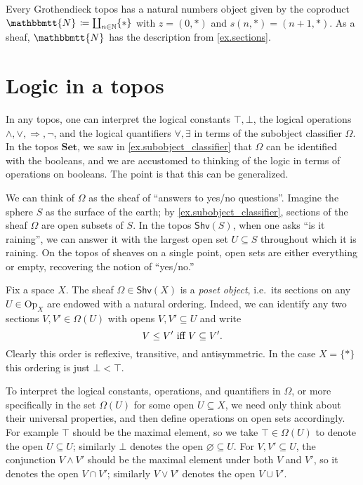\documentclass[11pt, oneside, article]{memoir}
\theoremstyle{plain}
\theoremstyle{definition}
\theoremstyle{remark}
\renewcommand{\ss}{\subseteq}
\newcommand{\Set}[1]{\mathrm{#1}}
\newcommand{\Cat}[1]{\mathbf{#1}}
\newcommand{\Fun}[1]{\mathsf{#1}}
\newcommand{\smset}{\Cat{Set}}
\newcommand{\tn}[1]{\textnormal{#1}}
\newcommand{\internal}[1]{\raisebox{-.03ex}{$\mathbbmtt{#1}$}}
\newcommand{\hs}{\hspace{1.1pt}}
\newcommand{\nn}{\mathbb{N}}
\newcommand{\tnn}{\internal{N}\hs}
\newcommand{\shv}{\Fun{Shv}}
\newcommand{\Op}{\Set{Op}}
\newcommand{\imp}{\Rightarrow}
\newcommand{\true}{\top}
\newcommand{\false}{\bot}
\begin{document}
Every Grothendieck topos has a natural numbers object given by the coproduct $\tnn\coloneqq\coprod_{n\in\nn}\{*\}$ with $z=(0,*)$ and $s(n,*)=(n+1,*)$. As a sheaf, $\tnn$ has the description from \cref{ex.sections}.


\section{Logic in a topos}\label{sec.logic}

In any topos, one can interpret the logical constants $\true,\false$, the logical operations $\wedge,\vee,\imp,\neg$, and the logical quantifiers $\forall,\exists$ in terms of the subobject classifier $\Omega$. In the topos $\smset$, we saw in \cref{ex.subobject_classifier} that $\Omega$ can be identified with the booleans, and we are accustomed to thinking of the logic in terms of operations on booleans. The point is that this can be generalized.

We can think of $\Omega$ as the sheaf of ``answers to yes/no questions''. Imagine the sphere $S$ as the surface of the earth; by \cref{ex.subobject_classifier}, sections of the sheaf $\Omega$ are open subsets of $S$. In the topos $\shv(S)$, when one asks ``is it raining'', we can answer it with the largest open set $U\ss S$ throughout which it is raining. On the topos of sheaves on a single point, open sets are either everything or empty, recovering the notion of ``yes/no.''

Fix a space $X$. The sheaf $\Omega\in\shv(X)$ is a \emph{poset object}, i.e.\ its sections on any $U\in\Op_X$ are endowed with a natural ordering. Indeed, we can identify any two sections $V,V'\in\Omega(U)$ with opens $V,V'\ss U$ and write
\begin{equation}\label{eqn.prop_order}
V\leq V'\tn{ iff }V\ss V'.
\end{equation} 
Clearly this order is reflexive, transitive, and antisymmetric. In the case $X=\{*\}$ this ordering is just $\false<\true$.

To interpret the logical constants, operations, and quantifiers in $\Omega$, or more specifically in the set $\Omega(U)$ for some open $U\ss X$, we need only think about their universal properties, and then define operations on open sets accordingly. For example $\true$ should be the maximal element, so we take $\true\in\Omega(U)$ to denote the open $U\ss U$; similarly $\false$ denotes the open $\varnothing\ss U$. For $V,V'\ss U$, the conjunction $V\wedge V'$ should be the maximal element under both $V$ and $V'$, so it denotes the open $V\cap V'$; similarly $V\vee V'$ denotes the open $V\cup V'$.
\end{document}
